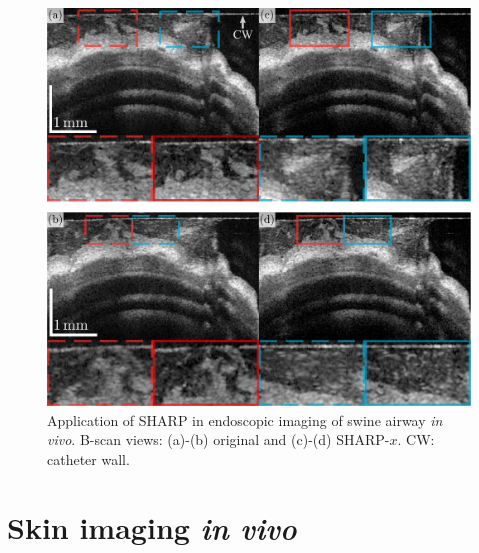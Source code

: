 \begin{figure}[htb!]
	\centering
	\includegraphics[width=.9\textwidth]{Figures/Results/CatheterImaging.pdf}
	\caption[Application of SHARP in endoscopic imaging of swine airway \textit{in vivo}.]{Application of SHARP in endoscopic imaging of swine airway \textit{in vivo}. B-scan views: (a)-(b) original and (c)-(d) SHARP-$x$. CW: catheter wall.}
	\label{fig:CatheterImaging}
\end{figure}

\FloatBarrier

\section{Skin imaging \textit{in vivo}}

